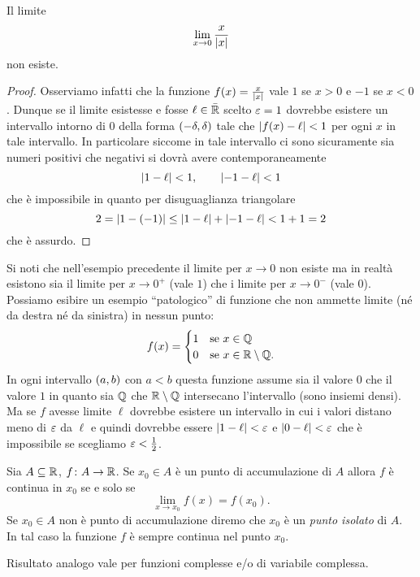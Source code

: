 \begin{example}
Il limite 
\[
  \lim_{x\to 0} \frac{x}{{\left|x\right|}}
\]
non esiste. 
\end{example}
\begin{proof}
Osserviamo infatti che la funzione $f(x) = \frac{x}{{\left|x\right|}}$ 
vale $1$ se $x>0$ e $-1$ se $x<0$.
Dunque se il limite esistesse e fosse $\ell\in \bar {{\mathbb R}}$ 
scelto $\varepsilon=1$ dovrebbe esistere un intervallo intorno di $0$ 
della forma $\left(-\delta,\delta\right)$ tale che 
${\left|f(x)-\ell\right|}<1$ per ogni $x$ in tale intervallo.
In particolare siccome in tale intervallo ci sono sicuramente 
sia numeri positivi che negativi si dovrà avere 
contemporaneamente
\[
  {\left|1-\ell\right|}<1, \qquad 
  {\left|-1-\ell\right|}<1  
\]
che è impossibile in quanto per disuguaglianza triangolare 
\[
 2 = {\left|1-(-1)\right|} 
 \le {\left|1-\ell\right|} + {\left|-1-\ell\right|}
 < 1 + 1 = 2
\]
che è assurdo.
\end{proof}

Si noti che nell'esempio precedente il limite per $x\to 0$ 
non esiste ma in realtà esistono sia il limite per $x\to 0^+$ 
(vale $1$) che i limite per $x\to 0^-$ (vale $0$).
Possiamo esibire un esempio ``patologico'' di funzione 
che non ammette limite (né da destra né da sinistra)
in nessun punto:
\[
  f(x) = 
  \begin{cases}
     1 & \text{se $x\in {\mathbb Q}$}\\ 
     0 & \text{se $x\in {\mathbb R}\setminus {\mathbb Q}$}.
  \end{cases}
\]
In ogni intervallo $\left(a,b\right)$ con $a<b$ questa funzione 
assume sia il valore $0$ che il valore $1$ 
in quanto sia ${\mathbb Q}$ che ${\mathbb R}\setminus {\mathbb Q}$ intersecano 
l'intervallo (sono insiemi densi).
Ma se $f$ avesse limite $\ell$ dovrebbe esistere un intervallo 
in cui i valori distano meno di $\varepsilon$ da $\ell$ e quindi 
dovrebbe essere ${\left|1-\ell\right|}<\varepsilon$ e ${\left|0-\ell\right|}<\varepsilon$
che è impossibile se scegliamo $\varepsilon < \frac 1 2$.

\begin{theorem}%
\mymark{***}%
  Sia $A\subseteq {\mathbb R}$, $f\colon A \to {\mathbb R}$. 
  Se $x_0\in A$ è un punto di accumulazione di $A$
  allora $f$ è continua in $x_0$ se e solo se
  \[
    \lim_{x\to x_0}f(x) = f(x_0).
  \]
  Se $x_0\in A$ non è punto di accumulazione diremo 
  che $x_0$ è un \emph{punto isolato}%
%
 di $A$.
  In tal caso la funzione $f$ è sempre continua nel punto $x_0$.

Risultato analogo vale per funzioni complesse e/o di variabile complessa.
\end{theorem}
  
